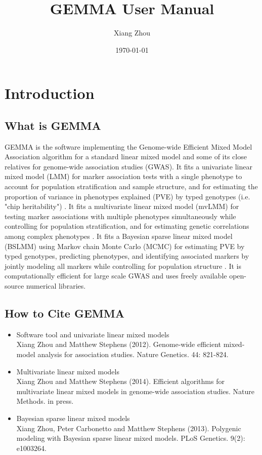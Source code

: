 \documentclass[11pt]{article}
\title{GEMMA User Manual}
\author{Xiang Zhou}
\date{\today}
\begin{document}
\maketitle

\tableofcontents

\newpage





\section{Introduction}

\subsection{What is GEMMA}
GEMMA is the software implementing the Genome-wide Efficient Mixed Model Association algorithm \cite{Zhou:2012} for a standard linear mixed model and some of its close relatives for genome-wide association studies (GWAS). It fits a univariate linear mixed model (LMM) for marker association tests with a single phenotype to account for population stratification and sample structure, and for estimating the proportion of variance in phenotypes explained (PVE) by typed genotypes (i.e. "chip heritability") \cite{Zhou:2012}.  It fits a multivariate linear mixed model (mvLMM) for testing marker associations with multiple phenotypes simultaneously while controlling for population stratification, and for estimating genetic correlations among complex phenotypes \cite{Zhou:2013b}. It fits a Bayesian sparse linear mixed model (BSLMM) using Markov chain Monte Carlo (MCMC) for estimating PVE by typed genotypes, predicting phenotypes, and identifying associated markers by jointly modeling all markers while controlling for population structure \cite{Zhou:2013}. It is computationally efficient for large scale GWAS and uses freely available open-source numerical libraries.


\subsection{How to Cite GEMMA}
\begin{itemize}
\item Software tool and univariate linear mixed models \\
Xiang Zhou and Matthew Stephens (2012). Genome-wide efficient mixed-model analysis for association studies. Nature Genetics. 44: 821-824.
\item Multivariate linear mixed models \\
Xiang Zhou and Matthew Stephens (2014). Efficient algorithms for multivariate linear mixed models in genome-wide association studies. Nature Methods. in press.
\item Bayesian sparse linear mixed models \\
Xiang Zhou, Peter Carbonetto and Matthew Stephens (2013). Polygenic modeling with Bayesian sparse linear mixed models. PLoS Genetics. 9(2): e1003264.
\end{itemize}
\end{document}
